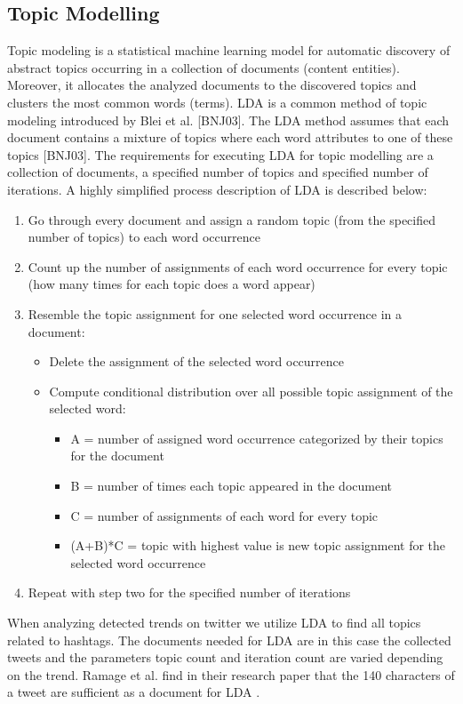 \subsection{Topic Modelling}
\label{subsec:topic-modelling}
Topic modeling is a statistical machine learning model for automatic discovery of abstract topics occurring in a collection of documents (content entities). Moreover, it allocates the analyzed documents to the discovered topics and clusters the most common words (terms). \acf{LDA} is a common method of topic modeling introduced by Blei et al. [BNJ03]. The \ac{LDA} method assumes that each document contains a mixture of topics where each word attributes to one of these topics [BNJ03]. The requirements for executing \ac{LDA} for topic modelling are a collection of documents, a specified number of topics and specified number of iterations. A highly simplified process description of LDA is described below:
\begin{enumerate}
  \item{Go through every document and assign a random topic (from the specified number of topics) to each word occurrence}
  \item{Count up the number of assignments of each word occurrence for every topic (how many times for each topic does a word appear)}
  \item{Resemble the topic assignment for one selected word occurrence in a document:}
  \begin{itemize}
    \item{Delete the assignment of the selected word occurrence}
    \item{Compute conditional distribution over all possible topic assignment of the selected word:}
    \begin{itemize}
      \item{A = number of assigned word occurrence categorized by their topics for the document}
      \item{B = number of times each topic appeared in the document}
      \item{C = number of assignments of each word for every topic}
      \item{(A+B)*C = topic with highest value is new topic assignment for the selected word occurrence}
    \end{itemize}
  \end{itemize}
  \item{Repeat with step two for the specified number of iterations}
\end{enumerate}
When analyzing detected trends on twitter we utilize \ac{LDA} to find all topics related to hashtags. The documents needed for \ac{LDA} are in this case the collected tweets and the parameters topic count and iteration count are varied depending on the trend. Ramage et al. find in their research paper that the 140 characters of a tweet are sufficient as a document for \ac{LDA} \cite{ramage2010lda}.



